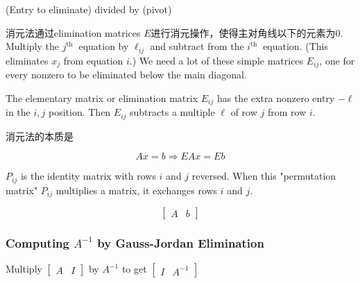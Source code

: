 \begin{definition}[Multiplier]
    (Entry to eliminate) divided by (pivot)
\end{definition}

消元法通过elimination matrices $E$进行消元操作，使得主对角线以下的元素为0. Multiply the $ j^{\text {th }} $ equation by $ \ell_{i j} $ and subtract from the $ i^{\text {th }} $ equation. (This eliminates $ x_{j} $ from equation $ i $.) We need a lot of these simple matrices $ E_{i j} $, one for every nonzero to be eliminated below the main diagonal.

\begin{definition}
    The elementary matrix or elimination matrix $ E_{i j} $ has the extra nonzero entry $ -\ell $ in the $ i, j $ position. Then $ E_{i j} $ subtracts a multiple $ \ell $ of row $ j $ from row $ i $.
\end{definition}

\begin{theorem}
    消元法的本质是

    $$Ax= b \Rightarrow EAx = Eb$$
\end{theorem}

\begin{definition}
    $  P_{i j} $ is the identity matrix with rows $ i $ and $ j $ reversed. When this "permutation matrix" $ P_{i j} $ multiplies a matrix, it exchanges rows $ i $ and $ j $.
\end{definition}

\begin{definition}
    $$\displaystyle \left[\begin{matrix}
                A & b
            \end{matrix}\right]$$
\end{definition}

\subsubsection{Computing $A^{-1}$ by Gauss-Jordan Elimination}

\begin{center}
    Multiply $\displaystyle \left[\begin{matrix}
                A & I
            \end{matrix}\right]$ by $\displaystyle A^{-1}$ to get $\displaystyle \left[\begin{matrix}
                I & A^{-1}
            \end{matrix}\right]$
\end{center}


